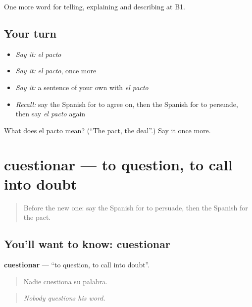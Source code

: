 \begin{grammarlens}[title={What you've built}]
One more word for telling, explaining and describing at B1.
\end{grammarlens}

\subsection*{Your turn}
\begin{itemize}
\raggedright
  \item \emph{Say it:} \emph{el pacto}
  \item \emph{Say it:} \emph{el pacto}, once more
  \item \emph{Say it:} a sentence of your own with \emph{el pacto}
  \item \emph{Recall:} say the Spanish for to agree on, then the Spanish for to persuade, then say \emph{el pacto} again
\end{itemize}

\begin{tcolorbox}[breakable,colback=teal!4,colframe=teal!35!black,title={Before you move on}]
What does el pacto mean? (\textquotedblleft{}The pact, the deal\textquotedblright{}.) Say it once more.
\end{tcolorbox}
\section[cuestionar]{cuestionar — to question, to call into doubt}

\label{lesson:ES-C635-cuestionar}



\begin{quote}
Before the new one: say the Spanish for to persuade, then the Spanish for the pact.
\end{quote}

\subsection*{You'll want to know: cuestionar}
\textbf{cuestionar} — \textquotedblleft{}to question, to call into doubt\textquotedblright{}.

\begin{quote}
Nadie cuestiona su palabra.
\end{quote}

\begin{quote}
\emph{Nobody questions his word.}
\end{quote}

